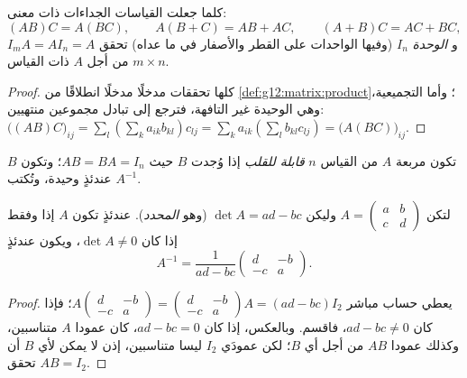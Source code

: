 \begin{proposition}\label{prop:g12:matrix:rules}
كلما جعلت القياسات الجداءات ذات معنى:
\[
(AB)C = A(BC), \qquad A(B + C) = AB + AC, \qquad (A+B)C = AC + BC,
\]
و\emph{ الوحدة} $I_n$ (وفيها الواحدات على القطر والأصفار في ما عداه)
تحقق $I_m A = A I_n = A$ من أجل $A$ ذات القياس $m \times n$.
\end{proposition}

\begin{proof}
كلها تحققات مدخلًا مدخلًا انطلاقًا من
\cref{def:g12:matrix:product}؛ وأما التجميعية، وهي الوحيدة غير التافهة،
فترجع إلى تبادل مجموعين منتهيين:
$\bigl((AB)C\bigr)_{ij} = \sum_l \left(\sum_k a_{ik}b_{kl}\right) c_{lj}
= \sum_k a_{ik} \left(\sum_l b_{kl} c_{lj}\right)
= \bigl(A(BC)\bigr)_{ij}$.
\end{proof}

\begin{definition}[المقلوب]\label{def:g12:matrix:inverse}
تكون  مربعة $A$ من القياس $n$ \emph{قابلة للقلب}
إذا وُجدت  $B$ حيث $AB = BA = I_n$؛ وتكون $B$ عندئذٍ وحيدة، وتُكتب
$A^{-1}$.
\end{definition}

\begin{proposition}\label{prop:g12:matrix:inverse2x2}
لتكن $A = \begin{pmatrix} a & b\\ c & d\end{pmatrix}$ وليكن
$\det A = ad - bc$ (وهو \emph{المحدد}). عندئذٍ تكون $A$
 إذا وفقط إذا كان $\det A \neq 0$، ويكون عندئذٍ
\[
A^{-1} = \frac{1}{ad - bc}\begin{pmatrix} d & -b\\ -c & a\end{pmatrix}.
\]
\end{proposition}

\begin{proof}
يعطي حساب مباشر
$A \begin{pmatrix} d & -b\\ -c & a\end{pmatrix}
= \begin{pmatrix} d & -b\\ -c & a\end{pmatrix} A = (ad - bc) I_2$؛ فإذا كان
$ad - bc \neq 0$، فاقسم. وبالعكس، إذا كان $ad - bc = 0$، كان عمودا $A$
متناسبين، وكذلك عمودا $AB$ من أجل أي $B$؛ لكن
عمودَي $I_2$ ليسا متناسبين، إذن لا يمكن لأي $B$ أن تحقق $AB = I_2$.
\end{proof}

